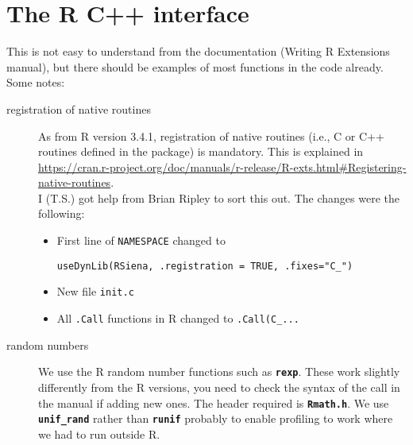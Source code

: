 \documentclass[12pt, a4paper]{article}
\renewcommand{\=}{\,=\,}
\newcommand{\+}{\,+\,}
\newcommand{\sfn}[1]{\textbf{\texttt{#1}}}
\begin{document}
\section{The R C++ interface}
This is not easy to understand from the documentation (Writing R Extensions
manual), but there should be examples of most functions in the code
already. Some notes:
\begin{description}
\item[registration of native routines]
As from R version 3.4.1, registration of native routines (i.e., C or C++
routines defined in the package) is mandatory. This is explained
in \url{https://cran.r-project.org/doc/manuals/r-release/R-exts.html#Registering-native-routines}.\\
I (T.S.) got help from Brian Ripley to sort this out.
The changes were the following:
\begin{itemize}
  \item First line of \texttt{NAMESPACE} changed to
  \begin{verbatim}
useDynLib(RSiena, .registration = TRUE, .fixes="C_")
  \end{verbatim}
  \item New file \texttt{init.c}
  \item All \texttt{.Call} functions in R changed to \texttt{.Call(C\_...}
\end{itemize}
\item[random numbers]
We use the R random number functions such as \sfn{rexp}. These work slightly
differently from the R versions, you need to check the syntax of the call in
the manual if adding new ones. The header required is \sfn{Rmath.h}. We use
\sfn{unif\_rand} rather than \sfn{runif} probably to enable profiling to
work where we had to run outside R.


\end{description}
\end{document}
